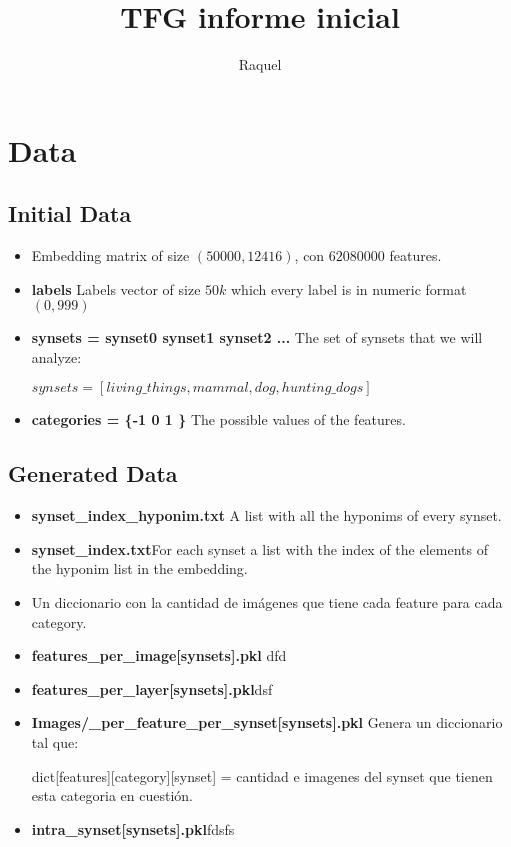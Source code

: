 \documentclass{article}
\title{TFG informe inicial}
\author{Raquel}
\begin{document}
\maketitle

\tableofcontents

\section{Data}
\subsection{Initial Data}
\begin{itemize}
\item Embedding matrix of size $(50000, 12416)$, con $62080000$ features.
\item \textbf{labels} Labels vector of size $50k$ which every label is in numeric format $(0,999)$
\item \textbf{synsets = synset0 synset1 synset2 ...} The set of synsets that we will analyze: 

$ synsets = [living\_things, mammal, dog, hunting\_dogs]$

\item \textbf{categories = \{-1 0 1 \}} The possible values of the features.
\end{itemize}
\subsection{Generated Data}
\begin{itemize}
\item \textbf{synset\_index\_hyponim.txt} A list with all the hyponims of every synset.


\item \textbf{synset\_index.txt}For each synset a list with the index of the elements of the hyponim list in the embedding.


\item Un diccionario con la cantidad de imágenes que tiene cada feature para cada category. 
\item \textbf{features\_per\_image[synsets].pkl} dfd
\item \textbf{features\_per\_layer[synsets].pkl}dsf
\item \textbf{Images/\_per\_feature\_per\_synset[synsets].pkl} Genera un diccionario tal que:

dict[features][category][synset] = cantidad e imagenes del synset que tienen esta categoria en cuestión.
\item \textbf{intra\_synset[synsets].pkl}fdsfs
\end{itemize}
\end{document}
